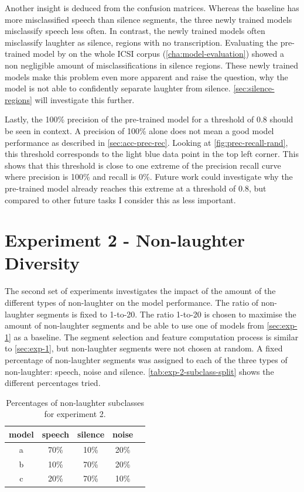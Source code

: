 \documentclass[bsc,frontabs,parskip,deptreport]{infthesis}
\begin{document}
Another insight is deduced from the confusion matrices. Whereas the baseline has more misclassified speech than silence segments, the three newly trained models misclassify speech less often. 
In contrast, the newly trained models often misclassify laughter as silence, regions with no transcription.
Evaluating the pre-trained model by \citet{gillick2021robust} on the whole ICSI corpus (\autoref{cha:model-evaluation}) showed a non negligible amount of misclassifications in silence regions. 
These newly trained models make this problem even more apparent and raise the question, why the model is not able to confidently separate laughter from silence. \autoref{sec:silence-regions} will investigate this further.

Lastly, the 100\% precision of the pre-trained model for a threshold of 0.8 should be seen in context. A precision of 100\% alone does not mean a good model performance as described in \autoref{sec:acc-prec-rec}. Looking at \autoref{fig:prec-recall-rand}, this threshold corresponds to the light blue data point in the top left corner. This shows that this threshold is close to one extreme of the precision recall curve where precision is 100\% and recall is 0\%. Future work could investigate why the pre-trained model already reaches this extreme at a threshold of 0.8, but compared to other future tasks I consider this as less important.

\section{Experiment 2 - Non-laughter Diversity} \label{sec:exp2}
The second set of experiments investigates the impact of the amount of the different types of non-laughter on the model performance. 
The ratio of non-laughter segments is fixed to 1-to-20. The ratio 1-to-20 is chosen to maximise the amount of non-laughter segments and be able to use one of models from \autoref{sec:exp-1} as a baseline.
The segment selection and feature computation process is similar to \autoref{sec:exp-1}, but non-laughter segments were not chosen at random. A fixed percentage of non-laughter segments was assigned to each of the three types of non-laughter: speech, noise and silence.
\autoref{tab:exp-2-subclass-split} shows the different percentages tried.

\begin{table}[h!]
    \centering
    \begin{tabular}{|c|c|c|c|c|}
        \hline
        model & speech & silence & noise \\
        \hline
        a &  70\% & 10\% & 20\% \\
        b &  10\%  & 70\% &  20\%\\
        c &  20\%  & 70\% & 10\% \\ 
        \hline
    \end{tabular}
    \caption{Percentages of non-laughter subclasses for experiment 2.}
    \label{tab:exp-2-subclass-split}
\end{table}
\end{document}
